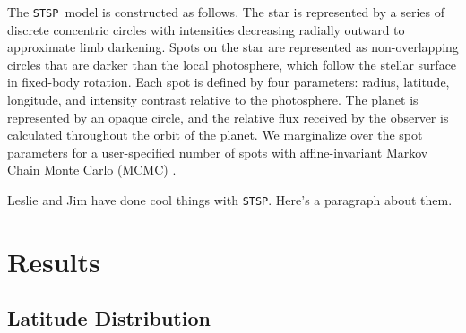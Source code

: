 \documentclass[iop]{emulateapj}
\newcommand{\stsp}{\texttt{STSP}}
\begin{document}
The \stsp\ model is constructed as follows. The star is represented by a series of discrete concentric circles with intensities decreasing radially outward to approximate limb darkening. Spots on the star are represented as non-overlapping circles that are darker than the local photosphere, which follow the stellar surface in fixed-body rotation. Each spot is defined by four parameters: radius, latitude, longitude, and intensity contrast relative to the photosphere. The planet is represented by an opaque circle, and the relative flux received by the observer is calculated throughout the orbit of the planet. We marginalize over the spot parameters for a user-specified number of spots with  affine-invariant Markov Chain Monte Carlo (MCMC) \citep{Goodman2010}.

Leslie and Jim have done cool things with \stsp. Here's a paragraph about them.








\section{Results}

\subsection{Latitude Distribution}
\end{document}
